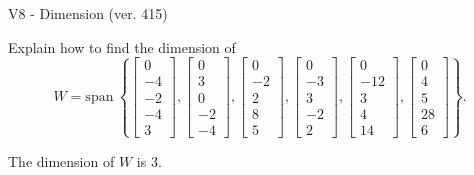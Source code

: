 \begin{exercise}
  \begin{exerciseTitle}V8 - Dimension (ver. 415)\end{exerciseTitle}
  \begin{exerciseStatement}
    Explain how to find the dimension of 
\[W=\mathrm{span}\ \left\{\left[\begin{array}{r}
0 \\
-4 \\
-2 \\
-4 \\
3
\end{array}\right] , \left[\begin{array}{r}
0 \\
3 \\
0 \\
-2 \\
-4
\end{array}\right] , \left[\begin{array}{r}
0 \\
-2 \\
2 \\
8 \\
5
\end{array}\right] , \left[\begin{array}{r}
0 \\
-3 \\
3 \\
-2 \\
2
\end{array}\right] , \left[\begin{array}{r}
0 \\
-12 \\
3 \\
4 \\
14
\end{array}\right] , \left[\begin{array}{r}
0 \\
4 \\
5 \\
28 \\
6
\end{array}\right]\right\}.\]



  \end{exerciseStatement}
  \begin{exerciseAnswer}
   The dimension of \(W\) is  \(3\).
  


  \end{exerciseAnswer}
\end{exercise}